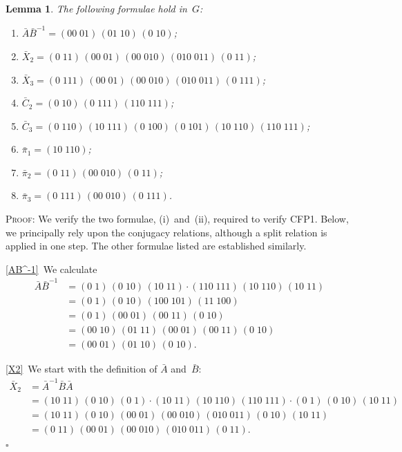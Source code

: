\documentclass[a4paper,11pt]{article}
\numberwithin{equation}{section}
\newcommand{\swap}[2]{(#1\;#2)}
\newcommand{\qed}{\hspace*{\fill}$\square$}
\newtheorem{lemma}[thm]{Lemma}
\newenvironment{proof}{%
  \begin{trivlist}\item\textsc{Proof:}}{\qed\end{trivlist}}
\begin{document}
\begin{lemma}
  The following formulae hold in~$G$:
  \begin{enumerate}
  \item
    \label{AB^-1}
    $\bar{A} \bar{B}^{-1} = \swap{00}{01} \, \swap{01}{10} \,
    \swap{0}{10}$;
  \item
    \label{X2}
    $\bar{X}_{2} = \swap{0}{11} \, \swap{00}{01} \, \swap{00}{010} \,
    \swap{010}{011} \, \swap{0}{11}$;
  \item
    \label{X3}
    $\bar{X}_{3} = \swap{0}{111} \, \swap{00}{01} \, \swap{00}{010} \,
    \swap{010}{011} \, \swap{0}{111}$;
  \item
    \label{C2}
    $\bar{C}_{2} = \swap{0}{10} \, \swap{0}{111} \, \swap{110}{111}$;
  \item $\bar{C}_{3} = \swap{0}{110} \, \swap{10}{111} \,
    \swap{0}{100} \, \swap{0}{101} \, \swap{10}{110} \,
    \swap{110}{111}$;
  \item $\bar{\pi}_{1} = \swap{10}{110}$;
  \item $\bar{\pi}_{2} = \swap{0}{11} \, \swap{00}{010} \,
    \swap{0}{11}$;
  \item $\bar{\pi}_{3} = \swap{0}{111} \, \swap{00}{010} \,
    \swap{0}{111}$.
  \end{enumerate}
\end{lemma}

\begin{proof}
  We verify the two formulae, (i)~and~(ii), required to verify CFP1.
  Below, we principally rely upon the conjugacy
  relations, although a split relation is applied in one step.
  The other formulae listed are established
  similarly.
  
  \ref{AB^-1}~We calculate
  \begin{align*}
    \bar{A} \bar{B}^{-1} &=
    \swap{0}{1} \, \swap{0}{10} \, \swap{10}{11} \cdot \swap{110}{111}
    \, \swap{10}{110} \, \swap{10}{11} \\
    &= \swap{0}{1} \, \swap{0}{10} \, \swap{100}{101} \,
    \swap{11}{100} \\
    &= \swap{0}{1} \, \swap{00}{01} \, \swap{00}{11} \, \swap{0}{10}
    \\
    &= \swap{00}{10} \, \swap{01}{11} \, \swap{00}{01} \,
    \swap{00}{11} \, \swap{0}{10} \\
    &= \swap{00}{01} \, \swap{01}{10} \, \swap{0}{10}.
  \end{align*}

  \ref{X2}~We start with the definition of $\bar{A}$ and~$\bar{B}$:
  \begin{align*}
    \bar{X}_{2} &= \bar{A}^{-1} \bar{B} \bar{A} \\
    &= \swap{10}{11} \, \swap{0}{10} \, \swap{0}{1} \cdot
    \swap{10}{11} \, \swap{10}{110} \, \swap{110}{111} \cdot
    \swap{0}{1} \, \swap{0}{10} \, \swap{10}{11} \\
    &= \swap{10}{11} \, \swap{0}{10} \, \swap{00}{01} \,
    \swap{00}{010} \, \swap{010}{011} \, \swap{0}{10} \, \swap{10}{11}
    \\
    &= \swap{0}{11} \, \swap{00}{01} \, \swap{00}{010} \,
    \swap{010}{011} \, \swap{0}{11}.
  \end{align*}
\end{proof}
\end{document}

